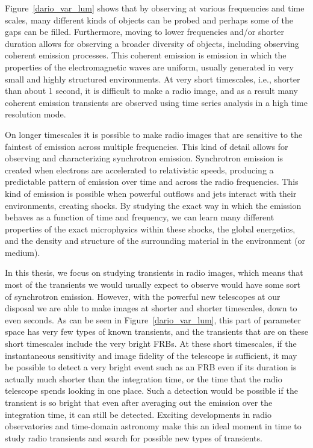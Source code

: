 \documentclass[12pt]{article}
\begin{document}
Figure~\ref{dario_var_lum} \citep{2015MNRAS.446.3687P} shows that by observing at various frequencies and time scales, many different kinds of objects can be probed and perhaps some of the gaps can be filled. Furthermore, moving to lower frequencies and/or shorter duration allows for observing a broader diversity of objects, including observing coherent emission processes. This coherent emission is emission in which the properties of the electromagnetic waves are uniform, usually generated in very small and highly structured environments. At very short timescales, i.e., shorter than about 1 second, it is difficult to make a radio image, and as a result many coherent emission transients are observed using time series analysis in a high time resolution mode. 

On longer timescales it is possible to make radio images that are sensitive to the faintest of emission across multiple frequencies. This kind of detail allows for observing and characterizing synchrotron emission. Synchrotron emission is created when electrons are accelerated to relativistic speeds, producing a predictable pattern of emission over time and across the radio frequencies. This kind of emission is possible when powerful outflows and jets interact with their environments, creating shocks. By studying the exact way in which the emission behaves as a function of time and frequency, we can learn many different properties of the exact microphysics within these shocks, the global energetics, and the density and structure of the surrounding material in the environment (or medium).

 In this thesis, we focus on studying transients in radio images, which means that most of the transients we would usually expect to observe would have some sort of synchrotron emission. However, with the powerful new telescopes at our disposal we are able to make images at shorter and shorter timescales, down to even seconds. As can be seen in Figure~\ref{dario_var_lum}, this part of parameter space has very few types of known transients, and the transients that are on these short timescales include the very bright FRBs. At these short timescales, if the instantaneous sensitivity and image fidelity of the telescope is sufficient, it may be possible to detect a very bright event such as an FRB even if its duration is actually much shorter than the integration time, or the time that the radio telescope spends looking in one place. Such a detection would be possible if the transient is so bright that even after averaging out the emission over the integration time, it can still be detected. Exciting developments in radio observatories and time-domain astronomy make this an ideal moment in time to study radio transients and search for possible new types of transients.
\end{document}
